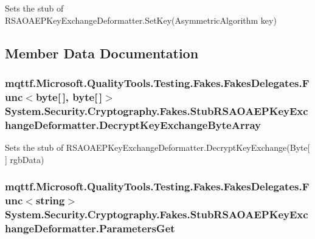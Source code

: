 Sets the stub of R\-S\-A\-O\-A\-E\-P\-Key\-Exchange\-Deformatter.\-Set\-Key(\-Asymmetric\-Algorithm key)



\subsection{Member Data Documentation}
\hypertarget{class_system_1_1_security_1_1_cryptography_1_1_fakes_1_1_stub_r_s_a_o_a_e_p_key_exchange_deformatter_aefe2589612c69cd7060de186382d05b8}{
\subsubsection[{Decrypt\-Key\-Exchange\-Byte\-Array}]{\setlength{\rightskip}{0pt plus 5cm}mqttf.\-Microsoft.\-Quality\-Tools.\-Testing.\-Fakes.\-Fakes\-Delegates.\-Func$<$byte\mbox{[}$\,$\mbox{]}, byte\mbox{[}$\,$\mbox{]}$>$ System.\-Security.\-Cryptography.\-Fakes.\-Stub\-R\-S\-A\-O\-A\-E\-P\-Key\-Exchange\-Deformatter.\-Decrypt\-Key\-Exchange\-Byte\-Array}}\label{class_system_1_1_security_1_1_cryptography_1_1_fakes_1_1_stub_r_s_a_o_a_e_p_key_exchange_deformatter_aefe2589612c69cd7060de186382d05b8}


Sets the stub of R\-S\-A\-O\-A\-E\-P\-Key\-Exchange\-Deformatter.\-Decrypt\-Key\-Exchange(\-Byte\mbox{[}$\,$\mbox{]} rgb\-Data)

\hypertarget{class_system_1_1_security_1_1_cryptography_1_1_fakes_1_1_stub_r_s_a_o_a_e_p_key_exchange_deformatter_ae1e2cea68bbfbb7908c14a7ed88350c5}{
\subsubsection[{Parameters\-Get}]{\setlength{\rightskip}{0pt plus 5cm}mqttf.\-Microsoft.\-Quality\-Tools.\-Testing.\-Fakes.\-Fakes\-Delegates.\-Func$<$string$>$ System.\-Security.\-Cryptography.\-Fakes.\-Stub\-R\-S\-A\-O\-A\-E\-P\-Key\-Exchange\-Deformatter.\-Parameters\-Get}}\label{class_system_1_1_security_1_1_cryptography_1_1_fakes_1_1_stub_r_s_a_o_a_e_p_key_exchange_deformatter_ae1e2cea68bbfbb7908c14a7ed88350c5}


